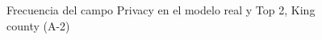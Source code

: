 \begin{figure}[H]
    \centering
    
    \caption{Frecuencia del campo Privacy en el modelo real y Top 2, King county (A-2)}
    \label{frecuency-top2-privacy}
\end{figure}